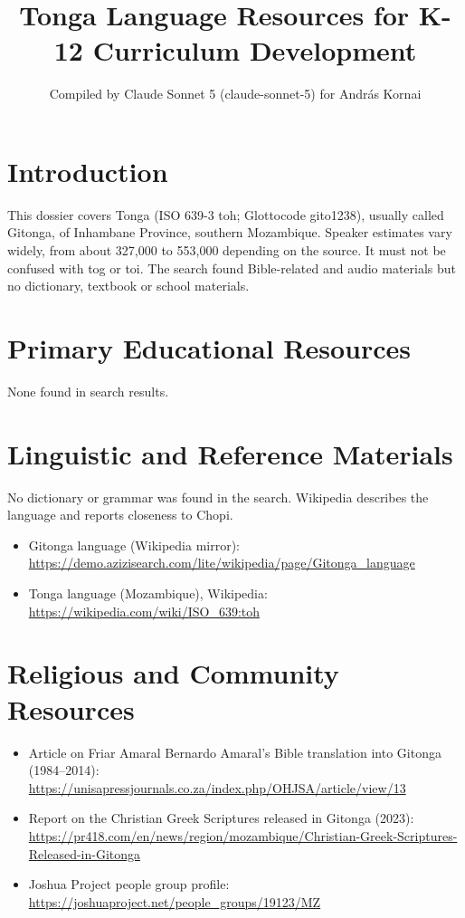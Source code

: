 \documentclass[12pt]{article}
\title{Tonga Language Resources for K-12 Curriculum Development}
\author{Compiled by Claude Sonnet 5 (claude-sonnet-5) for Andr\'as Kornai}
\date{}
\begin{document}
\maketitle

\section{Introduction}
This dossier covers Tonga (ISO 639-3 toh; Glottocode gito1238), usually called Gitonga, of Inhambane Province, southern Mozambique. Speaker estimates vary widely, from about 327,000 to 553,000 depending on the source. It must not be confused with tog or toi. The search found Bible-related and audio materials but no dictionary, textbook or school materials.

\section{Primary Educational Resources}
None found in search results.

\section{Linguistic and Reference Materials}
No dictionary or grammar was found in the search. Wikipedia describes the language and reports closeness to Chopi.
\begin{itemize}
\item Gitonga language (Wikipedia mirror): \url{https://demo.azizisearch.com/lite/wikipedia/page/Gitonga_language}
\item Tonga language (Mozambique), Wikipedia: \url{https://wikipedia.com/wiki/ISO_639:toh}
\end{itemize}

\section{Religious and Community Resources}
\begin{itemize}
\item Article on Friar Amaral Bernardo Amaral's Bible translation into Gitonga (1984--2014): \url{https://unisapressjournals.co.za/index.php/OHJSA/article/view/13}
\item Report on the Christian Greek Scriptures released in Gitonga (2023): \url{https://pr418.com/en/news/region/mozambique/Christian-Greek-Scriptures-Released-in-Gitonga}
\item Joshua Project people group profile: \url{https://joshuaproject.net/people_groups/19123/MZ}
\end{itemize}
\end{document}
